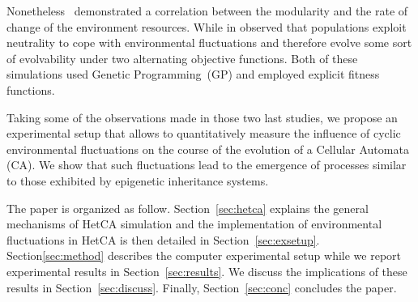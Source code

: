 Nonetheless~\cite{lipson2002origin} demonstrated a correlation between the modularity and the rate of change of the environment resources. While in \cite{yu2007program} observed that populations exploit neutrality to cope with environmental fluctuations and therefore evolve some sort of evolvability under two alternating objective functions. Both of these simulations used Genetic Programming~(GP) and employed explicit fitness functions.

Taking some of the observations made in those two last studies, we propose an experimental setup that allows to quantitatively measure the influence of cyclic environmental fluctuations on the course of the evolution of a Cellular Automata (CA). We show that such fluctuations lead to the emergence of processes similar to those exhibited by epigenetic inheritance systems. 

The paper is organized as follow. Section~\ref{sec:hetca} explains the general mechanisms of HetCA simulation and the implementation of environmental fluctuations in HetCA is then detailed in Section~\ref{sec:exsetup}. Section\ref{sec:method} describes the computer experimental setup while we report experimental results in Section~\ref{sec:results}. We discuss the implications of these results in Section~\ref{sec:discuss}. Finally, Section~\ref{sec:conc} concludes the paper.

